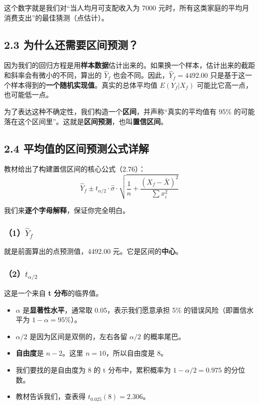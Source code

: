 \documentclass[12pt,a4paper]{article}
\begin{document}
这个数字就是我们对“当人均月可支配收入为 7000 元时，所有这类家庭的平均月消费支出”的最佳猜测（点估计）。

\subsection*{2.3 为什么还需要区间预测？}

因为我们的回归方程是用\textbf{样本数据}估计出来的。如果换一个样本，估计出来的截距和斜率会有微小的不同，算出的 \(\hat{Y}_f\) 也会不同。因此，\(\hat{Y}_f = 4492.00\) 只是基于这一个样本得到的\textbf{一个随机实现值}。真实的总体平均值 \(E(Y_f|X_f)\) 可能比它高一点，也可能低一点。

为了表达这种不确定性，我们构造一个\textbf{区间}，并声称“真实的平均值有 95\% 的可能落在这个区间里”。这就是\textbf{区间预测}，也叫\textbf{置信区间}。

\subsection*{2.4 平均值的区间预测公式详解}

教材给出了构建置信区间的核心公式（2.76）：
\[
\hat{Y}_f \pm t_{\alpha/2} \cdot \hat{\sigma} \cdot \sqrt{ \frac{1}{n} + \frac{(X_f - \bar{X})^2}{\sum x_i^2} }
\]

我们来\textbf{逐个字母解释}，保证你完全明白。

\subsubsection*{（1）\(\hat{Y}_f\)}
就是前面算出的点预测值，4492.00 元。它是区间的\textbf{中心}。

\subsubsection*{（2）\(t_{\alpha/2}\)}
这是一个来自 \textbf{t 分布}的临界值。
\begin{itemize}
\item \(\alpha\) 是\textbf{显著性水平}，通常取 0.05，表示我们愿意承担 5\% 的错误风险（即置信水平为 \(1-\alpha = 95\%\)）。
\item \(\alpha/2\) 是因为区间是双侧的，左右各留 \(\alpha/2\) 的概率尾巴。
\item \textbf{自由度}是 \(n-2\)。这里 \(n=10\)，所以自由度是 8。
\item 我们要找的是自由度为 8 的 t 分布中，累积概率为 \(1 - \alpha/2 = 0.975\) 的分位数。
\item 教材告诉我们，查表得 \(t_{0.025}(8) = 2.306\)。
\end{itemize}
\end{document}
